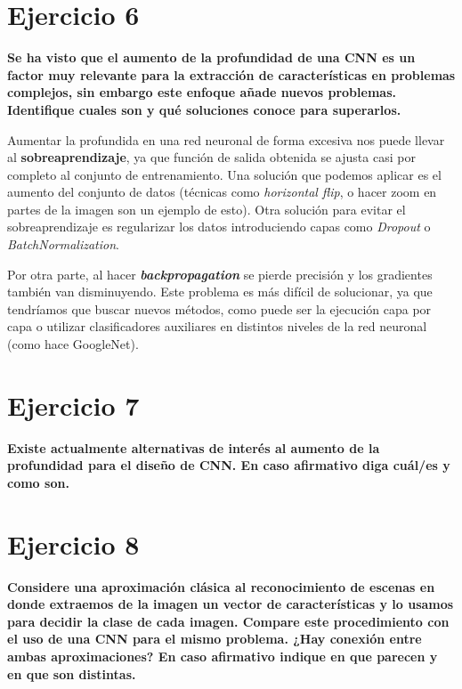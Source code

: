\documentclass[11pt,a4paper]{article}
\begin{document}
\section*{Ejercicio 6}

\textbf{Se ha visto que el aumento de la profundidad de una CNN es un factor muy relevante para la extracción de características en problemas complejos, sin
embargo este enfoque añade nuevos problemas. Identifique cuales son y qué soluciones conoce para superarlos.}

Aumentar la profundida en una red neuronal de forma excesiva nos puede llevar al \textbf{sobreaprendizaje}, ya que función de salida obtenida se ajusta casi por completo
al conjunto de entrenamiento. Una solución que podemos aplicar es el aumento del conjunto de datos (técnicas como \textit{horizontal flip}, o hacer zoom en partes
de la imagen son un ejemplo de esto). Otra solución para evitar el sobreaprendizaje es regularizar los datos introduciendo capas como \textit{Dropout} o
\textit{BatchNormalization}.

Por otra parte, al hacer \textbf{\textit{backpropagation}} se pierde precisión y los gradientes también van disminuyendo. Este problema es más difícil de solucionar,
ya que tendríamos que buscar nuevos métodos, como puede ser la ejecución capa por capa o utilizar clasificadores auxiliares en distintos niveles de la red neuronal
(como hace GoogleNet).


\section*{Ejercicio 7}

\textbf{Existe actualmente alternativas de interés al aumento de la profundidad para el diseño de CNN. En caso afirmativo diga cuál/es y como son.}




\section*{Ejercicio 8}

\textbf{Considere una aproximación clásica al reconocimiento de escenas en donde extraemos de la imagen un vector de características y lo usamos para decidir la
clase de cada imagen. Compare este procedimiento con el uso de una CNN para el mismo problema. ¿Hay conexión entre ambas aproximaciones? En caso afirmativo indique
en que parecen y en que son distintas.}
\end{document}
